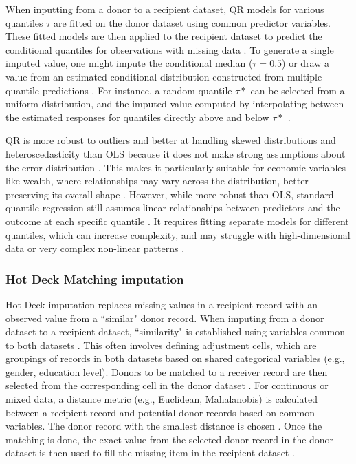When inputting from a donor to a recipient dataset, QR models for various quantiles $\tau$ are fitted on the donor dataset using common predictor variables. These fitted models are then applied to the recipient dataset to predict the conditional quantiles for observations with missing data \citep{parker_missing}. To generate a single imputed value, one might impute the conditional median ($\tau=0.5$) or draw a value from an estimated conditional distribution constructed from multiple quantile predictions \citep{wei2014multiple}. For instance, a random quantile $\tau*$ can be selected from a uniform distribution, and the imputed value computed by interpolating between the estimated responses for quantiles directly above and below $\tau*$ \citep{chen2007confidentiality}.

QR is more robust to outliers and better at handling skewed distributions and heteroscedasticity than OLS because it does not make strong assumptions about the error distribution \citep{zhao2023quantile}. This makes it particularly suitable for economic variables like wealth, where relationships may vary across the distribution, better preserving its overall shape \citep{kleinke2020multiple}. However, while more robust than OLS, standard quantile regression still assumes linear relationships between predictors and the outcome at each specific quantile \citep{meinshausen2006quantile}. It requires fitting separate models for different quantiles, which can increase complexity, and may struggle with high-dimensional data or very complex non-linear patterns \citep{meinshausen2006quantile}.

\subsubsection{Hot Deck Matching imputation}

Hot Deck imputation replaces missing values in a recipient record with an observed value from a ``similar" donor record. When imputing from a donor dataset to a recipient dataset, ``similarity" is established using variables common to both datasets \citep{dorazio2021statistical}. This often involves defining adjustment cells, which are groupings of records in both datasets   
based on shared categorical variables (e.g., gender, education level). Donors to be matched to a receiver record are then selected from the corresponding cell in the donor dataset \citep{chen2000nearest}. For continuous or mixed data, a distance metric (e.g., Euclidean, Mahalanobis) is calculated between a recipient record and potential donor records based on common variables. The donor record with the smallest distance is chosen \citep{dorazio2021statistical}. Once the matching is done, the exact value from the selected donor record in the donor dataset is then used to fill the missing item in the recipient dataset \citep{andridge2010review}.

